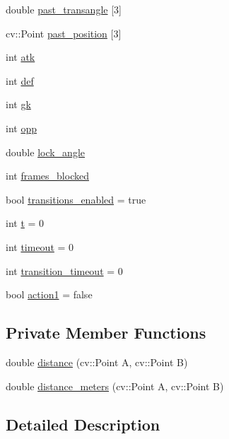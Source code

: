 \begin{DoxyCompactItemize}
\item 
double \hyperlink{class_strategy_a8f2c9428adf1de34e420106df1dc2f02}{past\+\_\+transangle} \mbox{[}3\mbox{]}
\item 
cv\+::\+Point \hyperlink{class_strategy_af25c3e91e0deb8592eae48c9bf8d2f18}{past\+\_\+position} \mbox{[}3\mbox{]}
\item 
int \hyperlink{class_strategy_af06cfb5e28b7a30cfaa312c7a1c051b1}{atk}
\item 
int \hyperlink{class_strategy_ade11a007d9479832ddc5e69169e23692}{def}
\item 
int \hyperlink{class_strategy_a7efb4f780b78ee593649340a7f948c36}{gk}
\item 
int \hyperlink{class_strategy_afca3fbf10bf6568a024a17ff588fe3f3}{opp}
\item 
double \hyperlink{class_strategy_a4661aa884907a2c561ca5353aeb7cbed}{lock\+\_\+angle}
\item 
int \hyperlink{class_strategy_a46130df98b586fe8b693e62d724c17fb}{frames\+\_\+blocked}
\item 
bool \hyperlink{class_strategy_a6d59806a95ef79a25d30c4f139c94671}{transitions\+\_\+enabled} = true
\item 
int \hyperlink{class_strategy_aafc0c4eee86b328c4e73a4d207359cdb}{t} = 0
\item 
int \hyperlink{class_strategy_a3460ae971a33867028f507f655353b55}{timeout} = 0
\item 
int \hyperlink{class_strategy_a5d821009839ab551e52df62c8c9fc2c0}{transition\+\_\+timeout} = 0
\item 
bool \hyperlink{class_strategy_a4de1cb2a30b7eb871e68ddefd03f6089}{action1} = false
\end{DoxyCompactItemize}
\subsection*{Private Member Functions}
\begin{DoxyCompactItemize}
\item 
double \hyperlink{class_strategy_aacce05caed71553c4efd2d28c9c3aa39}{distance} (cv\+::\+Point A, cv\+::\+Point B)
\item 
double \hyperlink{class_strategy_a4052503aaa94bdbc1fca9f552ef96dbb}{distance\+\_\+meters} (cv\+::\+Point A, cv\+::\+Point B)
\end{DoxyCompactItemize}


\subsection{Detailed Description}


